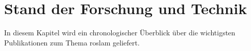 \begin{comment}
------------------------------------------------------------------------------------------
\end{comment}
\chapter{Stand der Forschung und Technik}

In diesem Kapitel wird ein chronologischer Überblick über die wichtigsten Publikationen zum Thema \Gls{roslam} geliefert.


\begin{comment}
------------------------------------------------------------------------------------------
- Preliminary results in range-only localization and mapping (189)
- Section 2
	- Statische Lokalisierung
		- Vorherige Sensorinformationen und Positionsschätzung werden nicht genutzt.
		- Annahme: Position der Beacons ist bekannt und fix.
	- Markovian probability grids
	- Mit fehlerfreien Messungen ist die Positionsbestimmung trivial
	- Entfernungsmessung mit einem erwarteten Fehler von 6 feet, also 1,82 meter. (1Fuß==30cm)
	- 1. Characterizing Range Measurements
		- Erstellen einer Verteilungsfunktion für die Entfernungsmessung
		- experimentel bestimmt
		- Diskrete Messungen in einem Set {0,6,12,...,50}
	- 2. Creating Probability Grids
		- Für jede Zelle des Grid wird die Wahrscheinlichkeit mittels der PDF berechnet.
	- 3. Combine Probability Grids
		- Multiply in a pointwise manner
		- scale the result so that the sum over the squares is one.
		- Aus den kombinierten Ergebnisgrid kann die schätzte Position mittels der gewichteten Durchschnitt der Gridzellen berechnet werden.
		- Covariance Matrix lässt sich auch bestimmen
	- Durchschnittlich geschätzer Fehler lag ab 1,62 feet bei einem geschätzen Entfernungsmess Fehler von 5.82 bis 7.18 feet.
- Section 3
	- Beacon positionen sind bekannt
	- Vorherige Positionsschätzung und Odometry daten werden verwendet.
	- Positionsverfolgung mittels Kalman und Monte Carlo
	- Kalman
		- Initiale Positionsschätzung wie in Section 2, jedoch mit drei Beacons.
		- Approximieren eines ringförmigen Gauß-Verteilung um die geschätzte Position.
		- Füttern eines entsprechenden EKF mit den Parametern
	- Monte Carlo
		- Verwendet die pdf aus Section 2 um die Partikels zu gewichten.
	- Durchschnittliche Geschätzter Fehler
		- EKT: 0,73 feet
		- MC: 0,93 feet
- Section 4
	- Lokalisieren in einer Umgebung mit unsicheren beacon positionen
		- Approximately known, good but not perfect
		- crude measurement or estimate location on blueprint
	- SLAM mit EKF
		- State ist die Robot-- und Beacon--Position
		- Error: init 5.13 feet, end 0.77 feet
\end{comment}

